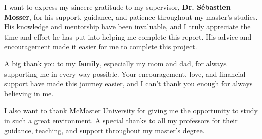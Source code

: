 
I want to express my sincere gratitude to my supervisor, \textbf{Dr. Sébastien Mosser}, for his support, guidance, and patience throughout my master’s studies. His knowledge and mentorship have been invaluable, and I truly appreciate the time and effort he has put into helping me complete this report. His advice and encouragement made it easier for me to complete this project.
\vspace{10pt}

A big thank you to my \textbf{family}, especially my mom and dad, for always supporting me in every way possible. Your encouragement, love, and financial support have made this journey easier, and I can’t thank you enough for always believing in me.
\vspace{10pt}

I also want to thank McMaster University for giving me the opportunity to study in such a great environment. A special thanks to all my professors for their guidance, teaching, and support throughout my master’s degree.